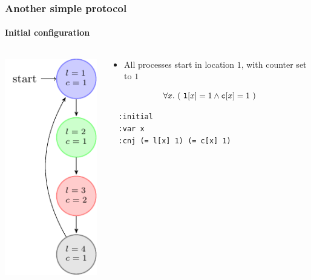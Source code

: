 \begin{frame}[fragile]
  \frametitle{Another simple protocol}
  \framesubtitle{Initial configuration}

\begin{columns}
\begin{column}{0.3\textwidth}
\centering
\includegraphics{pictures/demo-prot2-fig}
\end{column}
\begin{column}{0.7\textwidth}
  
  \begin{itemize}
    \item All processes start in location $1$, with counter set to $1$
  \end{itemize}

$$
\forall x.\ (\ {\tt l}[x] = 1 \wedge {\tt c}[x] = 1\ ) 
$$

\pause

  \begin{verbatim}
  :initial
  :var x
  :cnj (= l[x] 1) (= c[x] 1)
  \end{verbatim}
\end{column}

\end{columns}  

\end{frame}



